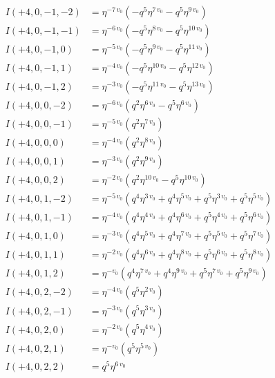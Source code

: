 \documentclass[11pt,a4paper]{article}
\begin{document}
\begin{align*}
I(+4, 0, -1, -2) &= \eta^{-7 \, v_{0}} \left( -q^{5} \eta^{7 \, v_{0}} - q^{5} \eta^{9 \, v_{0}} \right) \\
I(+4, 0, -1, -1) &= \eta^{-6 \, v_{0}} \left( -q^{5} \eta^{8 \, v_{0}} - q^{5} \eta^{10 \, v_{0}} \right) \\
I(+4, 0, -1, 0) &= \eta^{-5 \, v_{0}} \left( -q^{5} \eta^{9 \, v_{0}} - q^{5} \eta^{11 \, v_{0}} \right) \\
I(+4, 0, -1, 1) &= \eta^{-4 \, v_{0}} \left( -q^{5} \eta^{10 \, v_{0}} - q^{5} \eta^{12 \, v_{0}} \right) \\
I(+4, 0, -1, 2) &= \eta^{-3 \, v_{0}} \left( -q^{5} \eta^{11 \, v_{0}} - q^{5} \eta^{13 \, v_{0}} \right) \\
I(+4, 0, 0, -2) &= \eta^{-6 \, v_{0}} \left( q^{2} \eta^{6 \, v_{0}} - q^{5} \eta^{6 \, v_{0}} \right) \\
I(+4, 0, 0, -1) &= \eta^{-5 \, v_{0}} \left( q^{2} \eta^{7 \, v_{0}} \right) \\
I(+4, 0, 0, 0) &= \eta^{-4 \, v_{0}} \left( q^{2} \eta^{8 \, v_{0}} \right) \\
I(+4, 0, 0, 1) &= \eta^{-3 \, v_{0}} \left( q^{2} \eta^{9 \, v_{0}} \right) \\
I(+4, 0, 0, 2) &= \eta^{-2 \, v_{0}} \left( q^{2} \eta^{10 \, v_{0}} - q^{5} \eta^{10 \, v_{0}} \right) \\
I(+4, 0, 1, -2) &= \eta^{-5 \, v_{0}} \left( q^{4} \eta^{3 \, v_{0}} + q^{4} \eta^{5 \, v_{0}} + q^{5} \eta^{3 \, v_{0}} + q^{5} \eta^{5 \, v_{0}} \right) \\
I(+4, 0, 1, -1) &= \eta^{-4 \, v_{0}} \left( q^{4} \eta^{4 \, v_{0}} + q^{4} \eta^{6 \, v_{0}} + q^{5} \eta^{4 \, v_{0}} + q^{5} \eta^{6 \, v_{0}} \right) \\
I(+4, 0, 1, 0) &= \eta^{-3 \, v_{0}} \left( q^{4} \eta^{5 \, v_{0}} + q^{4} \eta^{7 \, v_{0}} + q^{5} \eta^{5 \, v_{0}} + q^{5} \eta^{7 \, v_{0}} \right) \\
I(+4, 0, 1, 1) &= \eta^{-2 \, v_{0}} \left( q^{4} \eta^{6 \, v_{0}} + q^{4} \eta^{8 \, v_{0}} + q^{5} \eta^{6 \, v_{0}} + q^{5} \eta^{8 \, v_{0}} \right) \\
I(+4, 0, 1, 2) &= \eta^{-v_{0}} \left( q^{4} \eta^{7 \, v_{0}} + q^{4} \eta^{9 \, v_{0}} + q^{5} \eta^{7 \, v_{0}} + q^{5} \eta^{9 \, v_{0}} \right) \\
I(+4, 0, 2, -2) &= \eta^{-4 \, v_{0}} \left( q^{5} \eta^{2 \, v_{0}} \right) \\
I(+4, 0, 2, -1) &= \eta^{-3 \, v_{0}} \left( q^{5} \eta^{3 \, v_{0}} \right) \\
I(+4, 0, 2, 0) &= \eta^{-2 \, v_{0}} \left( q^{5} \eta^{4 \, v_{0}} \right) \\
I(+4, 0, 2, 1) &= \eta^{-v_{0}} \left( q^{5} \eta^{5 \, v_{0}} \right) \\
I(+4, 0, 2, 2) &= q^{5} \eta^{6 \, v_{0}} \\
\end{align*}
\end{document}
